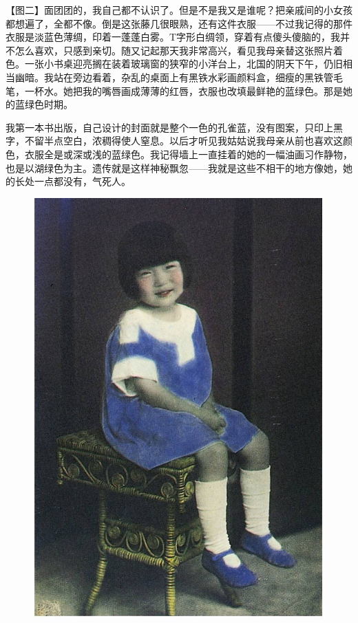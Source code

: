 \par 【图二】面团团的，我自己都不认识了。但是不是我又是谁呢？把亲戚间的小女孩都想遍了，全都不像。倒是这张藤几很眼熟，还有这件衣服——不过我记得的那件衣服是淡蓝色薄绸，印着一蓬蓬白雾。T字形白绸领，穿着有点傻头傻脑的，我并不怎么喜欢，只感到亲切。随又记起那天我非常高兴，看见我母亲替这张照片着色。一张小书桌迎亮搁在装着玻璃窗的狭窄的小洋台上，北国的阴天下午，仍旧相当幽暗。我站在旁边看着，杂乱的桌面上有黑铁水彩画颜料盒，细瘦的黑铁管毛笔，一杯水。她把我的嘴唇画成薄薄的红唇，衣服也改填最鲜艳的蓝绿色。那是她的蓝绿色时期。
\par 我第一本书出版，自己设计的封面就是整个一色的孔雀蓝，没有图案，只印上黑字，不留半点空白，浓稠得使人窒息。以后才听见我姑姑说我母亲从前也喜欢这颜色，衣服全是或深或浅的蓝绿色。我记得墙上一直挂着的她的一幅油画习作静物，也是以湖绿色为主。遗传就是这样神秘飘忽——我就是这些不相干的地方像她，她的长处一点都没有，气死人。
\begin{figure}[htb]
    \centering %
    \includegraphics[scale=0.4]{picture/对照记2.jpeg}
\end{figure}

